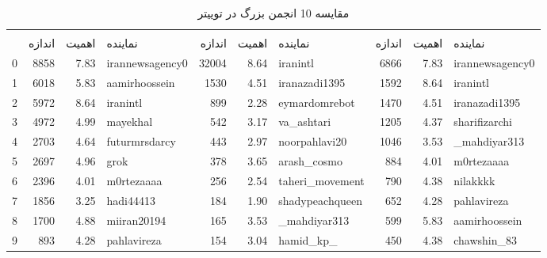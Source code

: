 \documentclass{article}
\begin{document}
	\begin{table}[h!]
		\centering
		\caption{مقایسه 10 انجمن بزرگ در توییتر}
		\label{tab:twitter}
		\begin{tabular}{lrrlrrlrrl}
			\toprule
			& \multicolumn{3}{c}{\lr{Louvain}} & \multicolumn{3}{c}{\lr{Label Propagation}} & \multicolumn{3}{c}{\lr{Infomap}} \\
			\cmidrule(lr){2-4} \cmidrule(lr){5-7} \cmidrule(lr){8-10}
			& اندازه & اهمیت & نماینده & اندازه & اهمیت & نماینده & اندازه & اهمیت & نماینده \\
			0 & 8858 & 7.83 & irannewsagency0 & 32004 & 8.64 & iranintl & 6866 & 7.83 & irannewsagency0 \\
			1 & 6018 & 5.83 & aamirhoossein & 1530 & 4.51 & iranazadi1395 & 1592 & 8.64 & iranintl \\
			2 & 5972 & 8.64 & iranintl & 899 & 2.28 & eymardomrebot & 1470 & 4.51 & iranazadi1395 \\
			3 & 4972 & 4.99 & mayekhal & 542 & 3.17 & va\_ashtari & 1205 & 4.37 & sharifizarchi \\
			4 & 2703 & 4.64 & futurmrsdarcy & 443 & 2.97 & noorpahlavi20 & 1046 & 3.53 & \_mahdiyar313 \\
			5 & 2697 & 4.96 & grok & 378 & 3.65 & arash\_cosmo & 884 & 4.01 & m0rtezaaaa \\
			6 & 2396 & 4.01 & m0rtezaaaa & 256 & 2.54 & taheri\_movement & 790 & 4.38 & nilakkkk \\
			7 & 1856 & 3.25 & hadi44413 & 184 & 1.90 & shadypeachqueen & 652 & 4.28 & pahlavireza \\
			8 & 1700 & 4.88 & miiran20194 & 165 & 3.53 & \_mahdiyar313 & 599 & 5.83 & aamirhoossein \\
			9 & 893 & 4.28 & pahlavireza & 154 & 3.04 & hamid\_kp\_ & 450 & 4.38 & chawshin\_83 \\
			\bottomrule
		\end{tabular}
	\end{table}
	
\end{document}
